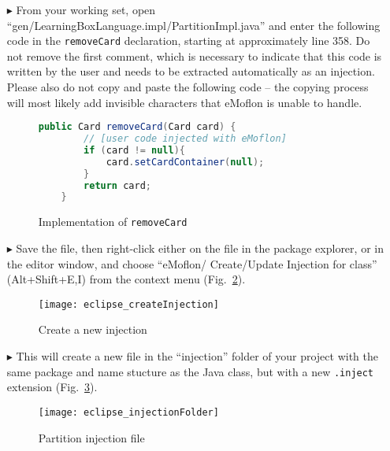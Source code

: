 \begin{itemize}

\item[$\blacktriangleright$] From your working set, open ``gen/LearningBoxLanguage.impl/Part\-it\-ionImpl.java'' and enter the following code in the
\texttt{removeCard} declaration, starting at approximately line 358. Do not remove the first comment, which is necessary to indicate that this code is written
by the user and needs to be extracted automatically as an injection. Please also do not copy and paste the following code -- the copying process will most
likely add invisible characters that eMoflon is unable to handle.

\vspace{0.5cm}

\begin{figure}[htbp]
        \centering
        \begin{lstlisting}[language=Java, keywordstyle={\bfseries\color{purple}}, backgroundcolor=\color{white}]
    public Card removeCard(Card card) {
        // [user code injected with eMoflon]
        if (card != null){
        	card.setCardContainer(null);
        }
        return card;
    }
        \end{lstlisting}
        \caption{Implementation of \texttt{removeCard}}
        \label{code:addToStringRep_impl}
\end{figure}

\vspace{0.5cm}

\item[$\blacktriangleright$] Save the file, then right-click either on the file in the package explorer, or in the editor window, and choose ``eMoflon/
Create/Update Injection for class'' (Alt+Shift+E,I) from the context menu (Fig.~\ref{eclipse:injection_create_injection}).

\begin{figure}[htbp]
    \centering
    \texttt{[image: eclipse\_createInjection]}
    \caption{Create a new injection}
    \label{eclipse:injection_create_injection}
\end{figure}

\item[$\blacktriangleright$] This will create a new file in the ``injection'' folder of your project with the same package and name stucture as the Java class,
but with a new \texttt{.inject} extension (Fig.~\ref{eclipse:injection_folder}).

\begin{figure}[htbp]
    \centering
    \texttt{[image: eclipse\_injectionFolder]}
    \caption{Partition injection file}
    \label{eclipse:injection_folder}
\end{figure}


\end{itemize}
